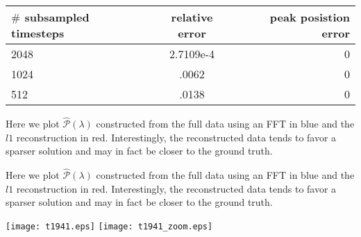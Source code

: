 \documentclass[10pt]{amsart}
\theoremstyle{remark}
\begin{document}
\begin{center}
\begin{tabular}{ l | c | r  }
  \hline                       
  $\#$ subsampled timesteps & relative error & peak posistion error\\ \hline
   2048 & 2.7109e-4 & 0\\
   1024 & .0062 & 0\\
   512 & .0138 & 0\\
  \hline  
\end{tabular}
\end{center}


Here we plot $\hat{\mathcal{P}}(\lambda)$ constructed from the full data using an FFT in blue and the $l1$ reconstruction in red. Interestingly, the reconstructed data tends to favor a sparser solution and may in fact be closer to the ground truth.

Here we plot $\hat{\mathcal{P}}(\lambda)$ constructed from the full data using an FFT in blue and the $l1$ reconstruction in red. Interestingly, the reconstructed data tends to favor a sparser solution and may in fact be closer to the ground truth.

\texttt{[image: t1941.eps]}
\texttt{[image: t1941\_zoom.eps]}




\end{document}
